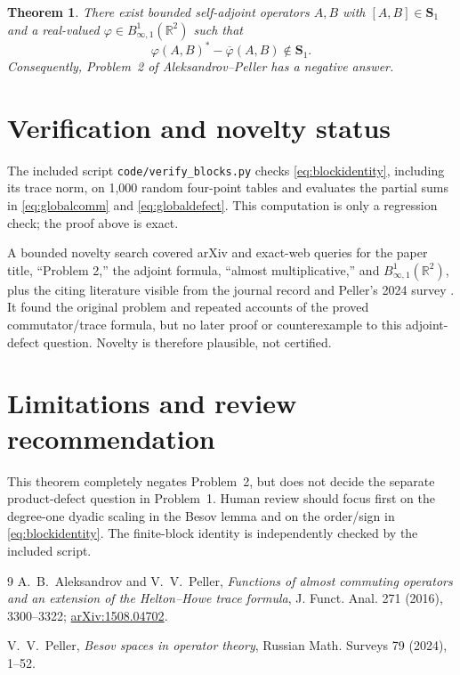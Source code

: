 \documentclass[11pt]{article}
\newtheorem{theorem}{Theorem}
\newcommand{\R}{\mathbb R}
\newcommand{\Sone}{\boldsymbol S_1}
\begin{document}
\begin{theorem}
There exist bounded self-adjoint operators $A,B$ with $[A,B]\in\Sone$ and a
real-valued $\varphi\in B^1_{\infty,1}(\R^2)$ such that
\[
 \varphi(A,B)^*-\overline\varphi(A,B)\notin\Sone.
\]
Consequently, Problem~2 of Aleksandrov--Peller has a negative answer.
\end{theorem}

\section{Verification and novelty status}

The included script \texttt{code/verify\_blocks.py} checks
\eqref{eq:blockidentity}, including its trace norm, on 1,000 random four-point
tables and evaluates the partial sums in \eqref{eq:globalcomm} and
\eqref{eq:globaldefect}.  This computation is only a regression check; the
proof above is exact.

A bounded novelty search covered arXiv and exact-web queries for the paper
title, ``Problem 2,'' the adjoint formula, ``almost multiplicative,'' and
$B^1_{\infty,1}(\R^2)$, plus the citing literature visible from the journal
record and Peller's 2024 survey \cite{PellerSurvey}.  It found the original
problem and repeated accounts of the proved commutator/trace formula, but no
later proof or counterexample to this adjoint-defect question.  Novelty is
therefore plausible, not certified.

\section{Limitations and review recommendation}

This theorem completely negates Problem~2, but does not decide the separate
product-defect question in Problem~1.  Human review
should focus first on the degree-one dyadic scaling in the Besov lemma and on
the order/sign in \eqref{eq:blockidentity}.  The finite-block identity is
independently checked by the included script.

\begin{thebibliography}{9}
A.~B.~Aleksandrov and V.~V.~Peller,
\emph{Functions of almost commuting operators and an extension of the
Helton--Howe trace formula},
J. Funct. Anal. 271 (2016), 3300--3322;
\href{https://arxiv.org/abs/1508.04702}{arXiv:1508.04702}.

V.~V.~Peller,
\emph{Besov spaces in operator theory},
Russian Math. Surveys 79 (2024), 1--52.
\end{thebibliography}
\end{document}
